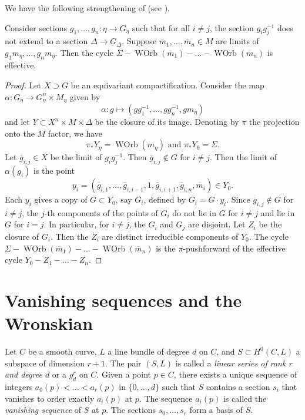 \documentclass[11pt]{amsart}
\providecommand {\from}{{\colon}}
\DeclareMathOperator{\WOrb}{WOrb}
\begin{document}
We have the following strengthening of  (see \cite[Proposition~2.13]{lee.pat.tse:19}).
\begin{proposition}\label{prop:manylimits}
  Consider sections \(g_1, \dots, g_n \from \eta \to G_\eta\) such that for all \(i \neq j\), the section \(g_ig_j^{-1}\) does not extend to a section \(\Delta \to G_\Delta\).
  Suppose \(\overline m_1, \dots, \overline m_n \in M\) are limits of \(g_1 m_\eta, \dots, g_n m_\eta\).
  Then the cycle \(\Sigma - \WOrb(\overline m_1) - \dots - \WOrb(\overline m_n)\) is effective.
\end{proposition}
\begin{proof}
  Let \(X \supset G\) be an equivariant compactification.
  Consider the map \(\alpha \colon G_\eta \to G_\eta^n \times M_\eta\) given by
  \[ \alpha \colon g \mapsto (gg_1^{-1}, \dots, gg_n^{-1}, gm_\eta)\]
  and let \(Y \subset X^n \times M \times \Delta\) be the closure of its image.
  Denoting by \(\pi\) the projection onto the \(M\) factor, we have
  \[ {\pi}_* Y_\eta = \WOrb(m_\eta) \text{ and } {\pi}_* Y_0 = \Sigma.\]
  Let \(\overline g_{i,j} \in X\) be the limit of \(g_ig_j^{-1}\).
  Then \(\overline g_{i,j} \not \in G\) for \(i \neq j\).
  Then the limit of \(\alpha(g_i)\) is the point
  \[ y_i = (\overline g_{i,1}, \dots, \overline g_{i,i-1}, 1, \overline g_{i,i+1}, \overline g_{i,n}, \overline m_i) \in Y_0.\]
  Each \(y_i\) gives a copy of \(G \subset Y_0\), say \(G_i\), defined by \(G_i = G \cdot y_i\).
  Since \(\overline g_{i,j} \not \in G\) for \(i \neq j\), the \(j\)-th components of the points of \(G_i\) do not lie in \(G\) for \(i \neq j\) and lie in \(G\) for \(i = j\).
  In particular, for \(i \neq j\), the \(G_i\) and \(G_j\) are disjoint.  
  Let \(Z_i\) be the closure of \(G_i\).
  Then the \(Z_i\) are distinct irreducible components of \(Y_0\).
  The cycle \(\Sigma - \WOrb(\overline m_1) - \dots - \WOrb(\overline m_n)\) is the \(\pi\)-pushforward of the effective cycle \(Y_0 - Z_1 - \dots - Z_n\).
\end{proof}

\section{Vanishing sequences and the Wronskian}\label{sec:van}
Let \(C\) be a smooth curve, \(L\) a line bundle of degree \(d\) on \(C\), and \(S \subset H^0(C,L)\) a subspace of dimension \(r+1\).
The pair \((S,L)\) is called a \emph{linear series of rank \(r\) and degree \(d\)} or a \(g^r_d\) on \(C\).
Given a point \(p \in C\), there exists a unique sequence of integers \(a_0(p) < \dots < a_r(p)\) in \(\{0,\dots,d\}\) such that \(S\) contains a section \(s_i\) that vanishes to order exactly \(a_i(p)\) at \(p\).
The sequence \(a_i(p)\) is called the \emph{vanishing sequence} of \(S\) at \(p\).
The sections \(s_0, \dots, s_r\) form a basis of \(S\).
\end{document}
